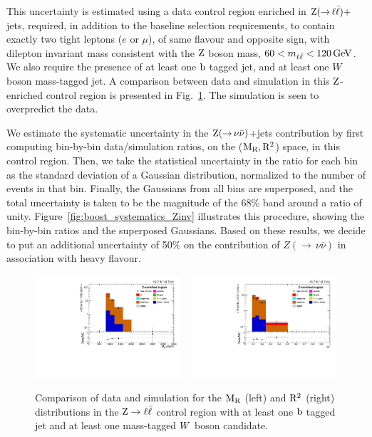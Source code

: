 This uncertainty is estimated using a data control region enriched in
$\mathrm{Z}({\rightarrow}\, \ell \bar{\ell})+$jets, required, in addition to the baseline selection
requirements, to contain exactly two tight leptons ($e$ or $\mu$), of same flavour and opposite
sign, with dilepton invariant mass consistent with the $\mathrm{Z}$ boson mass, $60 < m_{\ell\bar{\ell}} <
120\,\text{Ge\hspace{-.08em}V}$.
We also require the presence of at least one $\mathrm{b}$ tagged jet, and at least one $W$
boson mass-tagged jet.  A comparison between data and simulation in this $\mathrm{Z}$-enriched control
region is presented in Fig.~\ref{fig:DataMC_ZCR}. The simulation is seen to overpredict the data. 

We estimate the systematic uncertainty in the $\mathrm{Z}({\rightarrow}\,\nu\bar{\nu})$+jets contribution
by first computing bin-by-bin data/simulation ratios, on the ($\mathrm{M_R},\mathrm{R^2}$) space, in this control
region. Then, we take the statistical uncertainty in the ratio for each bin as the
standard deviation of a Gaussian distribution, normalized to the number of events in that bin.  
Finally, the Gaussians from all bins are superposed, and the total uncertainty is taken to be the
magnitude of the 68\% band around a ratio of unity. 
Figure~\ref{fig:boost_systematics_Zinv} illustrates this procedure, showing the bin-by-bin ratios
and the superposed Gaussians.
Based on these results, we decide to put an additional uncertainty of 50\% on the contribution of 
$Z({\rightarrow}\,\nu\bar{\nu})$ in association with heavy flavour. 

\begin{figure}[htpb]
\centering
\includegraphics[width=0.48\textwidth]{figures/razor_selection/plots/DataMC_MR_g1Mbg1Y2l0ol_width}
~
\includegraphics[width=0.48\textwidth]{figures/razor_selection/plots/DataMC_R2_g1Mbg1Y2l0ol_width}
\caption{Comparison of data and simulation for the $\mathrm{M_R}$ (left) and $\mathrm{R^2}$ (right) distributions in
the $\mathrm{Z}\rightarrow \ell \bar{\ell}$ control region with at least one $\mathrm{b}$ tagged jet and at
least one mass-tagged $W$ boson candidate. 
\label{fig:DataMC_ZCR}}
\end{figure}

